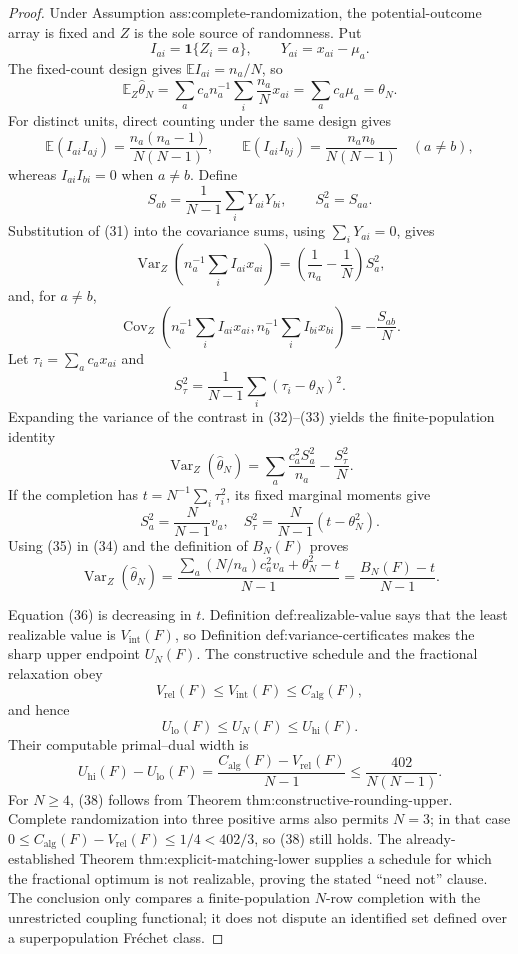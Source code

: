 \documentclass{article}
\begin{document}
\begin{proof}
Under Assumption ass:complete-randomization, the potential-outcome array is fixed and \(Z\) is the sole source of randomness.  Put
\[
 I_{ai}=\mathbf 1\{Z_i=a\},\qquad Y_{ai}=x_{ai}-\mu_a.
\]
The fixed-count design gives \(\mathbb E I_{ai}=n_a/N\), so
\[
 \mathbb E_Z\widehat\theta_N
 =\sum_ac_an_a^{-1}\sum_i\frac{n_a}{N}x_{ai}
 =\sum_ac_a\mu_a=\theta_N. \tag{30}
\]
For distinct units, direct counting under the same design gives
\[
 \mathbb E(I_{ai}I_{aj})=\frac{n_a(n_a-1)}{N(N-1)},\qquad
 \mathbb E(I_{ai}I_{bj})=\frac{n_an_b}{N(N-1)}\quad(a\ne b), \tag{31}
\]
whereas \(I_{ai}I_{bi}=0\) when \(a\ne b\).  Define
\[
 S_{ab}=\frac1{N-1}\sum_iY_{ai}Y_{bi},\qquad S_a^2=S_{aa}.
\]
Substitution of (31) into the covariance sums, using \(\sum_iY_{ai}=0\), gives
\[
 \operatorname{Var}_Z\left(n_a^{-1}\sum_iI_{ai}x_{ai}\right)
 =\left(\frac1{n_a}-\frac1N\right)S_a^2, \tag{32}
\]
and, for \(a\ne b\),
\[
 \operatorname{Cov}_Z\left(n_a^{-1}\sum_iI_{ai}x_{ai},
 n_b^{-1}\sum_iI_{bi}x_{bi}\right)=-\frac{S_{ab}}N. \tag{33}
\]
Let \(\tau_i=\sum_ac_ax_{ai}\) and
\[
 S_\tau^2=\frac1{N-1}\sum_i(\tau_i-\theta_N)^2.
\]
Expanding the variance of the contrast in (32)--(33) yields the finite-population identity
\[
 \operatorname{Var}_Z(\widehat\theta_N)
 =\sum_a\frac{c_a^2S_a^2}{n_a}-\frac{S_\tau^2}{N}. \tag{34}
\]
If the completion has \(t=N^{-1}\sum_i\tau_i^2\), its fixed marginal moments give
\[
 S_a^2=\frac{N}{N-1}v_a,\quad
 S_\tau^2=\frac{N}{N-1}(t-\theta_N^2). \tag{35}
\]
Using (35) in (34) and the definition of \(B_N(F)\) proves
\[
 \operatorname{Var}_Z(\widehat\theta_N)
 =\frac{\sum_a(N/n_a)c_a^2v_a+\theta_N^2-t}{N-1}
 =\frac{B_N(F)-t}{N-1}. \tag{36}
\]

Equation (36) is decreasing in \(t\).  Definition def:realizable-value says that the least realizable value is \(V_{\mathrm{int}}(F)\), so Definition def:variance-certificates makes the sharp upper endpoint \(U_N(F)\).  The constructive schedule and the fractional relaxation obey
\[
 V_{\mathrm{rel}}(F)\le V_{\mathrm{int}}(F)\le C_{\mathrm{alg}}(F),
\]
and hence
\[
 U_{\mathrm{lo}}(F)\le U_N(F)\le U_{\mathrm{hi}}(F). \tag{37}
\]
Their computable primal--dual width is
\[
 U_{\mathrm{hi}}(F)-U_{\mathrm{lo}}(F)
 =\frac{C_{\mathrm{alg}}(F)-V_{\mathrm{rel}}(F)}{N-1}
 \le\frac{402}{N(N-1)}. \tag{38}
\]
For \(N\ge4\), (38) follows from Theorem thm:constructive-rounding-upper.  Complete randomization into three positive arms also permits \(N=3\); in that case \(0\le C_{\mathrm{alg}}(F)-V_{\mathrm{rel}}(F)\le1/4<402/3\), so (38) still holds.  The already-established Theorem thm:explicit-matching-lower supplies a schedule for which the fractional optimum is not realizable, proving the stated ``need not'' clause.  The conclusion only compares a finite-population \(N\)-row completion with the unrestricted coupling functional; it does not dispute an identified set defined over a superpopulation Fr\'{e}chet class.


\end{proof}
\end{document}
